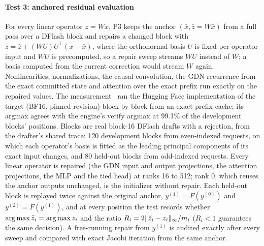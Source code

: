 \paragraph{Test 3: anchored residual evaluation}\label{sec:repair-residual} For every linear operator $z=Wx$, P3 keeps the anchor $(\bar x,\bar z=W\bar x)$ from a full pass over a DFlash block and repairs a changed block with $\tilde z=\bar z+(WU)U^\top(x-\bar x)$, where the orthonormal basis $U$ is fixed per operator input and $WU$ is precomputed, so a repair sweep streams $WU$ instead of $W$; a basis computed from the current correction would stream $W$ again. Nonlinearities, normalizations, the causal convolution, the GDN recurrence from the exact committed state and attention over the exact prefix run exactly on the repaired values. The measurement~ ran the Hugging Face implementation of the target (BF16, pinned revision) block by block from an exact prefix cache; its argmax agrees with the engine's verify argmax at 99.1\% of the development blocks' positions. Blocks are real block-16 DFlash drafts with a rejection, from the drafter's shared trace: 120 development blocks from even-indexed requests, on which each operator's basis is fitted as the leading principal components of its exact input changes, and 80 held-out blocks from odd-indexed requests. Every linear operator is repaired (the GDN input and output projections, the attention projections, the MLP and the tied head) at ranks 16 to 512; rank 0, which reuses the anchor outputs unchanged, is the initializer without repair. Each held-out block is replayed twice against the original anchor, $y^{(1)}=F(y^{(0)})$ and $y^{(2)}=F(y^{(1)})$, and at every position the test records whether $\operatorname*{arg\,max}\tilde z_i=\operatorname*{arg\,max} z_i$ and the ratio $R_i=2\lVert \tilde z_i-z_i\rVert_\infty/m_i$ ($R_i<1$ guarantees the same decision). A free-running repair from $y^{(1)}$ is audited exactly after every sweep and compared with exact Jacobi iteration from the same anchor.

